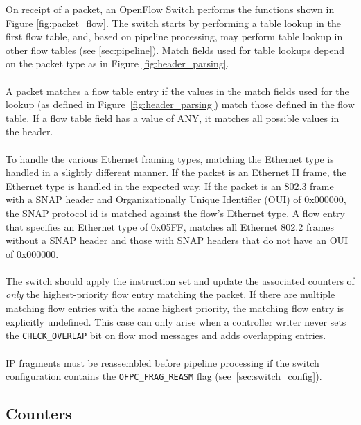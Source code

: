 \documentclass[10pt]{article}
\begin{document}
On receipt of a packet, an OpenFlow Switch performs the functions shown in Figure \ref{fig:packet_flow}. The switch starts by performing a table lookup in the first flow table, and, based on pipeline processing, may perform table lookup in other flow tables (see \ref{sec:pipeline}). Match fields used for table lookups depend on the packet type as in Figure \ref{fig:header_parsing}.
\\\\
A packet matches a flow table entry if the values in the match fields used for the lookup (as defined in Figure~\ref{fig:header_parsing}) match those defined in the flow table.  If a flow table field has a value of ANY, it matches all possible values in the header.  
\\\\
To handle the various Ethernet framing types, matching the Ethernet type is handled in a slightly different manner.  If the packet is an Ethernet II frame, the Ethernet type is handled in the expected way.  If the packet is an 802.3 frame with a SNAP header and Organizationally Unique Identifier (OUI) of 0x000000, the SNAP protocol id is matched against the flow's Ethernet type.  A flow entry that specifies an Ethernet type of 0x05FF, matches all Ethernet 802.2 frames without a SNAP header and those with SNAP headers that do not have an OUI of 0x000000.  
\\\\
The switch should apply the instruction set and update the associated counters of \emph{only} the highest-priority flow entry matching the packet.  If there are multiple matching flow entries with the same highest priority, the matching flow entry is explicitly undefined.  This case can only arise when a controller writer never sets the \verb|CHECK_OVERLAP| bit on flow mod messages and adds overlapping entries.
\\\\
IP fragments must be reassembled before pipeline processing if the switch configuration contains the \verb|OFPC_FRAG_REASM| flag (see~\ref{sec:switch_config}).


\subsection{Counters}
\end{document}
